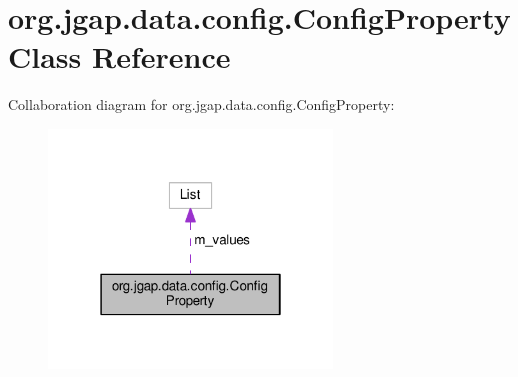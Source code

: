 \hypertarget{classorg_1_1jgap_1_1data_1_1config_1_1_config_property}{\section{org.\-jgap.\-data.\-config.\-Config\-Property Class Reference}
\label{classorg_1_1jgap_1_1data_1_1config_1_1_config_property}
}


Collaboration diagram for org.\-jgap.\-data.\-config.\-Config\-Property\-:
\nopagebreak
\begin{figure}[H]
\begin{center}
\leavevmode
\includegraphics[width=214pt]{classorg_1_1jgap_1_1data_1_1config_1_1_config_property__coll__graph}
\end{center}
\end{figure}
